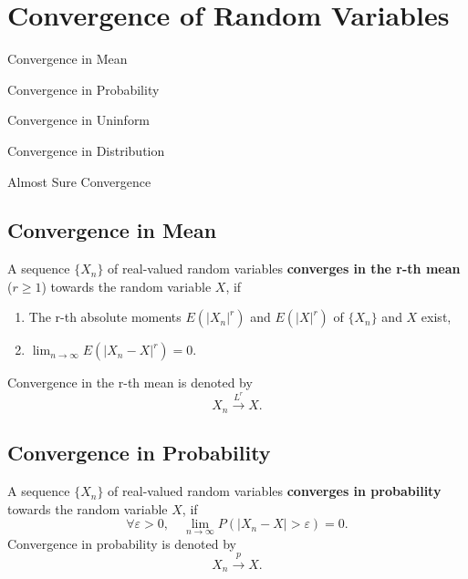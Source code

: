 \chapter{Convergence of Random Variables}

\begin{introduction}
    \item Convergence in Mean
    \item Convergence in Probability
    \item Convergence in Uninform
    \item Convergence in Distribution
    \item Almost Sure Convergence
\end{introduction}

\section{Convergence in Mean}

\begin{definition}
    A sequence $\{X_n\}$ of real-valued random variables \textbf{converges in the r-th mean} ($r\geq1$) towards the random variable $X$, if
    \begin{enumerate}
        \item The r-th absolute moments $E(|X_n|^r)$ and $E(|X|^r)$ of $\{X_n\}$ and $X$ exist,
        \item $\lim_{n\to\infty}E\left(|X_n-X|^r\right)=0$.
    \end{enumerate}
    Convergence in the r-th mean is denoted by
    \begin{equation}
        X_n \stackrel{L^r}{\rightarrow} X.
    \end{equation}
\end{definition}

\section{Convergence in Probability}

\begin{definition}
    A sequence $\{X_n\}$ of real-valued random variables \textbf{converges in probability} towards the random variable $X$, if
    \begin{equation}
        \forall\varepsilon>0,\quad\lim_{n\to\infty}P\left(|X_n-X|>\varepsilon\right)=0.
    \end{equation}
    Convergence in probability is denoted by
    \begin{equation}
        X_n \stackrel{p}{\rightarrow} X.
    \end{equation}
\end{definition}

